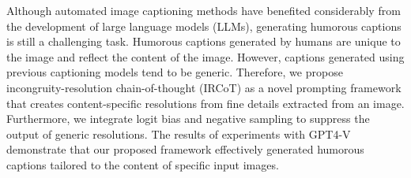 Although automated image captioning methods have benefited considerably from the development of large language models (LLMs), generating humorous captions is still a challenging task. Humorous captions generated by humans are unique to the image and reflect the content of the image. However, captions generated using previous captioning models tend to be generic. Therefore, we propose incongruity-resolution chain-of-thought (IRCoT) as a novel prompting framework that creates content-specific resolutions from fine details extracted from an image. Furthermore, we integrate logit bias and negative sampling to suppress the output of generic resolutions. The results of experiments with GPT4-V demonstrate that our proposed framework effectively generated humorous captions tailored to the content of specific input images.